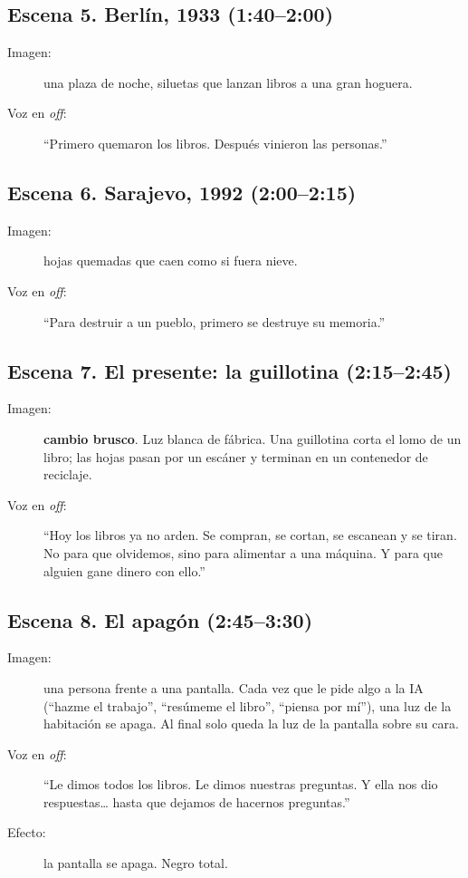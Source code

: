 \documentclass[11pt,a4paper,twoside,openright]{book}
\begin{document}
\subsection*{Escena 5. Berlín, 1933 (1:40--2:00)}
\begin{description}
  \item[Imagen:] una plaza de noche, siluetas que lanzan libros a una gran hoguera.
  \item[Voz en \textit{off}:] ``Primero quemaron los libros. Después vinieron
        las personas.''
\end{description}

\subsection*{Escena 6. Sarajevo, 1992 (2:00--2:15)}
\begin{description}
  \item[Imagen:] hojas quemadas que caen como si fuera nieve.
  \item[Voz en \textit{off}:] ``Para destruir a un pueblo, primero se destruye
        su memoria.''
\end{description}

\subsection*{Escena 7. El presente: la guillotina (2:15--2:45)}
\begin{description}
  \item[Imagen:] \textbf{cambio brusco}. Luz blanca de fábrica. Una guillotina
        corta el lomo de un libro; las hojas pasan por un escáner y terminan en
        un contenedor de reciclaje.
  \item[Voz en \textit{off}:] ``Hoy los libros ya no arden. Se compran, se cortan,
        se escanean y se tiran. No para que olvidemos, sino para alimentar a una
        máquina. Y para que alguien gane dinero con ello.''
\end{description}

\subsection*{Escena 8. El apagón (2:45--3:30)}
\begin{description}
  \item[Imagen:] una persona frente a una pantalla. Cada vez que le pide algo a
        la IA (``hazme el trabajo'', ``resúmeme el libro'', ``piensa por mí''),
        una luz de la habitación se apaga. Al final solo queda la luz de la
        pantalla sobre su cara.
  \item[Voz en \textit{off}:] ``Le dimos todos los libros. Le dimos nuestras
        preguntas. Y ella nos dio respuestas\ldots{} hasta que dejamos de hacernos
        preguntas.''
  \item[Efecto:] la pantalla se apaga. Negro total.
\end{description}
\end{document}
